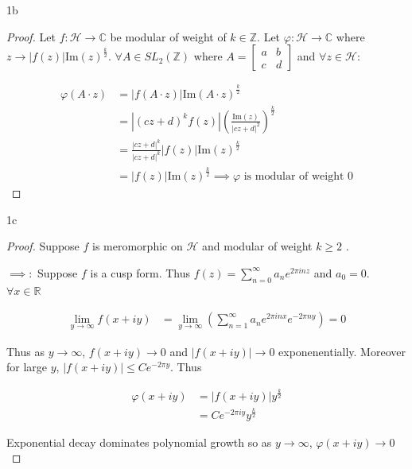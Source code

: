 \documentclass{article}
\newcommand*{\HC}{\mathcal{H}}
\newcommand{\C}{\mathbb{C}}
\newcommand{\R}{\mathbb{R}}
\newcommand{\Z}{\mathbb{Z}}
\newcommand{\abs}[1]{\left\lvert #1\right\rvert}
\newcommand{\IM}[1]{\text{Im}(#1)}
\begin{document}
\begin{PROB}{1b}\label{Problem 1b.}
\end{PROB}
\begin{proof}
    Let $f: \HC \to \C$ be modular of weight of $k \in \Z$. Let $\varphi: \HC \to \C$ where $z \to \abs{f(z)}\IM{z}^{\frac{k}{2}}$. $\forall A \in SL_2(\Z)$ where $A = \begin{bmatrix}
        a & b \\ c & d
    \end{bmatrix}$ and $\forall z \in \HC$:
    
    
    \begin{align*}
        \varphi(A \cdot z) &= \abs{f(A \cdot z)} \IM{A \cdot z}^{\frac{k}{2}} \\
        &= \abs{(cz + d)^k f(z)}\left(\frac{\IM{z}}{\abs{cz + d}^2}\right)^{\frac{k}{2}} \\
        &= \frac{\abs{cz + d}^k}{\abs{cz + d}^k} \abs{f(z)}\IM{z}^{\frac{k}{2}} \\
        &= \abs{f(z)}\IM{z}^{\frac{k}{2}} \implies \varphi \text{ is modular of weight 0}
    \end{align*}
\end{proof}

\begin{PROB}{1c}\label{Problem 1c.}
\end{PROB}
\begin{proof}
    Suppose $f$ is meromorphic on $\HC$ and modular of weight $k \geq 2$ . 
    
    $\implies:$ Suppose $f$ is a cusp form. Thus $f(z) = \sum_{n = 0}^{\infty} a_n e^{2 \pi i n z}$ and $a_0 = 0$. $\forall x \in \R$  

    \begin{align*}
        \lim_{y \to \infty}f(x + iy) &= \lim_{y \to \infty}\left(\sum_{n = 1}^{\infty} a_n e^{2 \pi i n x} e^{-2 \pi n y}\right) = 0
    \end{align*}

    Thus as $y \to \infty$, $f(x + iy) \to 0$ and $\abs{f(x + iy)} \to 0$ exponenentially. Moreover for large $y$, 
    $\abs{f(x + iy)} \leq Ce^{-2 \pi y}$. Thus 
    
    
    \begin{align*}
        \varphi(x + iy) &= \abs{f(x + iy)}y^{\frac{k}{2}} \\
        &= Ce^{- 2 \pi i y}y^{\frac{k}{2}}
    \end{align*}

    Exponential decay dominates polynomial growth so as $y \to \infty$, $\varphi(x + iy) \to 0$   
\end{proof}
\end{document}
